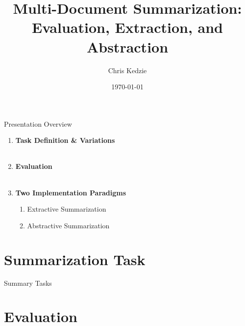 \documentclass[xcolor={table}]{beamer}
\title{Multi-Document Summarization: Evaluation, Extraction, and Abstraction}
\date{\today}
\author{Chris Kedzie}
\institute{Dept. of Computer Science, Columbia University}
\begin{document}
  \maketitle


\begin{frame}{Presentation Overview}

\begin{enumerate}
    \item \textbf{Task Definition \& Variations}
        ~\\~\\
    \item \textbf{Evaluation}
        ~\\~\\
    \item \textbf{Two Implementation Paradigms}
\begin{enumerate}
\item Extractive Summarization
\item Abstractive Summarization
\end{enumerate}
\end{enumerate}

\end{frame}


\section{Summarization Task}




\begin{frame}{Summary Tasks}
\end{frame}





\section{Evaluation}
\end{document}
